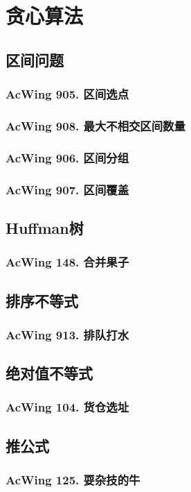\chapter{贪心算法}


\section{区间问题}

\subsection{AcWing 905. 区间选点}

\subsection{AcWing 908. 最大不相交区间数量}

\subsection{AcWing 906. 区间分组}

\subsection{AcWing 907. 区间覆盖}


\section{Huffman树}

\subsection{AcWing 148. 合并果子}


\section{排序不等式}

\subsection{AcWing 913. 排队打水}


\section{绝对值不等式}

\subsection{AcWing 104. 货仓选址}


\section{推公式}

\subsection{AcWing 125. 耍杂技的牛}
